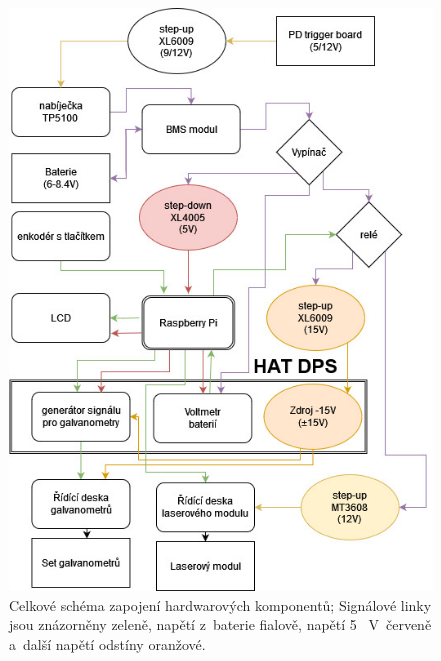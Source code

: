 \begin{figure}[H]
  \centering
  \includegraphics[width=\textwidth{}, trim=0 0 0 300, clip]{img/whole-scheme.jpg}\clearpage
  \caption{\label{fig:scheme-whole} Celkové schéma zapojení hardwarových komponentů; Signálové linky jsou znázorněny zeleně, napětí  z~baterie fialově, napětí 5 ~V~červeně  a~další napětí odstíny oranžové.}
\end{figure}

